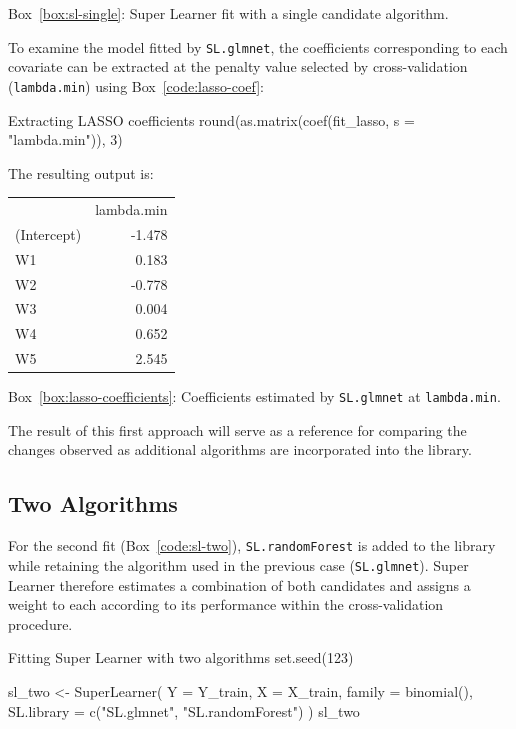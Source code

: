 \documentclass[12pt]{article}
\newcommand{\routputcaption}[2]{%
    \par\smallskip
    \begin{center}
        Box~\ref{#1}: #2
    \end{center}
}
\begin{document}
\routputcaption{box:sl-single}
{Super Learner fit with a single candidate algorithm.}

To examine the model fitted by \texttt{SL.glmnet}, the coefficients corresponding to 
each covariate can be extracted at the penalty value selected by cross-validation 
(\texttt{lambda.min}) using Box~\ref{code:lasso-coef}:

\begin{rcode}[label={code:lasso-coef}]{Extracting LASSO coefficients}
round(as.matrix(coef(fit_lasso, s = "lambda.min")), 3)
\end{rcode}

The resulting output is:

\begin{routputboxref}[label={box:lasso-coefficients}]
	\ttfamily
	\centering
	\begin{tabular}{lr}
		& lambda.min \\
		(Intercept) & -1.478 \\
		W1          &  0.183 \\
		W2          & -0.778 \\
		W3          &  0.004 \\
		W4          &  0.652 \\
		W5          &  2.545 \\
	\end{tabular}
\end{routputboxref}

\routputcaption{box:lasso-coefficients}
{Coefficients estimated by \texttt{SL.glmnet} at \texttt{lambda.min}.}

The result of this first approach will serve as a reference for comparing the changes 
observed as additional algorithms are incorporated into the library.

\subsection{Two Algorithms}
For the second fit (Box~\ref{code:sl-two}), \texttt{SL.randomForest} is added to the library while retaining the algorithm used in the previous case (\texttt{SL.glmnet}). Super Learner therefore estimates a combination of both candidates and assigns a weight to each according to its performance within the cross-validation procedure.

\begin{rcode}[label={code:sl-two}]{Fitting Super Learner with two algorithms}
set.seed(123)

sl_two <- SuperLearner(
  Y = Y_train, X = X_train,
  family = binomial(),
  SL.library = c("SL.glmnet", "SL.randomForest")
)
sl_two
\end{rcode}
\end{document}
